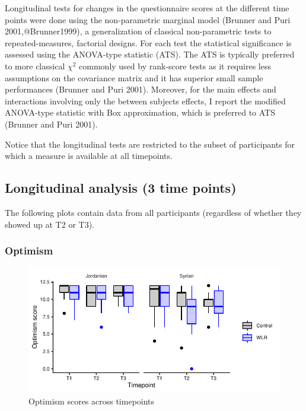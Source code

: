 \documentclass[]{article}
\begin{document}
Longitudinal tests for changes in the questionnaire scores at the
different time points were done using the non-parametric marginal model
(Brunner and Puri 2001,@Brunner1999), a generalization of classical
non-parametric tests to repeated-measures, factorial designs. For each
test the statistical significance is assessed using the ANOVA-type
statistic (ATS). The ATS is typically preferred to more classical
\(\chi^2\) commonly used by rank-score tests as it requires less
assumptions on the covariance matrix and it has superior small sample
performances (Brunner and Puri 2001). Moreover, for the main effects and
interactions involving only the between subjects effects, I report the
modified ANOVA-type statistic with Box approximation, which is preferred
to ATS (Brunner and Puri 2001).

Notice that the longitudinal tests are restricted to the subset of
participants for which a measure is available at all timepoints.

\newpage

\hypertarget{longitudinal-analysis-3-time-points}{%
\subsection{Longitudinal analysis (3 time
points)}\label{longitudinal-analysis-3-time-points}}

The following plots contain data from all participants (regardless of
whether they showed up at T2 or T3).

\hypertarget{optimism}{%
\subsubsection{Optimism}\label{optimism}}

\begin{figure}[H]

{\centering \includegraphics{WLR-analyses-report_files/figure-latex/unnamed-chunk-16-1} 

}

\caption{Optimism scores across timepoints}\label{fig:unnamed-chunk-16}
\end{figure}
\end{document}
